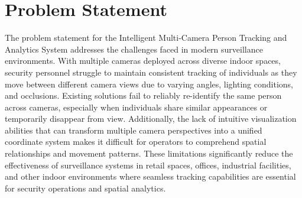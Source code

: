 \section{Problem Statement}
\label{section:problem-statement}

The problem statement for the Intelligent Multi-Camera Person Tracking and Analytics System addresses the challenges faced in modern surveillance environments. With multiple cameras deployed across diverse indoor spaces, security personnel struggle to maintain consistent tracking of individuals as they move between different camera views due to varying angles, lighting conditions, and occlusions. Existing solutions fail to reliably re-identify the same person across cameras, especially when individuals share similar appearances or temporarily disappear from view. Additionally, the lack of intuitive visualization abilities that can transform multiple camera perspectives into a unified coordinate system makes it difficult for operators to comprehend spatial relationships and movement patterns. These limitations significantly reduce the effectiveness of surveillance systems in retail spaces, offices, industrial facilities, and other indoor environments where seamless tracking capabilities are essential for security operations and spatial analytics.

